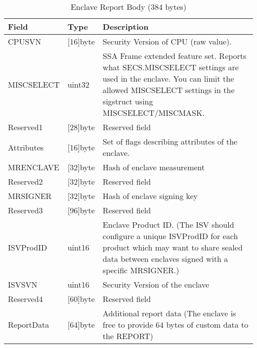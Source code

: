 \begin{table}[h]
	\begin{tabularx}{\textwidth}{|l|l|X|}
		\hline
		\textbf{Field}                & \textbf{Type}    &  \textbf{Description}     \\ \hline
		CPUSVN                        & {[}16{]}byte      &   Security Version of CPU (raw value). \\ \hline
		MISCSELECT                    & uint32           &    SSA Frame extended feature set. Reports what SECS.MISCSELECT settings are used in the enclave. You can limit the allowed MISCSELECT settings in the sigstruct using MISCSELECT/MISCMASK.   \\ \hline
		Reserved1                     & {[}28{]}byte     &    Reserved field  \\ \hline
		Attributes                    & {[}16{]}byte       &   Set of flags describing attributes of the enclave. \\ \hline
		MRENCLAVE                     & {[}32{]}byte  &    Hash of enclave measurement    \\ \hline
		Reserved2                     & {[}32{]}byte       &  Reserved field  \\ \hline
		MRSIGNER                      & {[}32{]}byte      &   Hash of enclave signing key  \\ \hline
		Reserved3                     & {[}96{]}byte       &  Reserved field  \\ \hline
		ISVProdID                     & uint16                & Enclave Product ID. (The ISV should configure a unique ISVProdID for each product which may want to share sealed data between enclaves signed with a specific MRSIGNER.)\\ \hline
		ISVSVN                        & uint16                & Security Version of the enclave\\ \hline
		Reserved4                     & {[}60{]}byte     &   Reserved field   \\ \hline
		ReportData                    & {[}64{]}byte       &  Additional report data (The enclave is free to provide 64 bytes of custom data to the REPORT)  \\ \hline
	\end{tabularx}
	\centering
	\caption{Enclave Report Body (384 bytes)  \cite{dcap_library_doc}}
	\label{quote-body-table}
\end{table}


